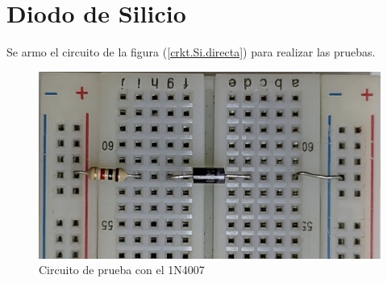 \documentclass[chaptersright]{informeutn}
\begin{document}
    \section{Diodo de Silicio}
      Se armo el circuito de la figura (\ref{crkt.Si.directa}) para realizar las pruebas.
      \begin{figure}[!ht]
        \centering
        \includegraphics[angle=180, width=.8\textwidth]{pictures/prot_crkt-1.jpg}
        \caption{Circuito de prueba con el 1N4007}
        \label{crkt.Si.prot}
      \end{figure}
\end{document}
